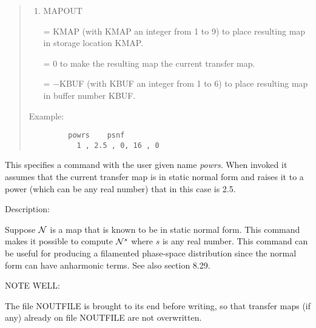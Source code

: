 \begin{quotation}
\begin{enumerate}
      \item  MAPOUT

             = KMAP (with KMAP an integer from 1 to 9) to place resulting
               map in \hspace*{1em}storage location KMAP.

             = 0 to make the resulting map the current transfer map.

             = $-$KBUF (with KBUF an integer from 1 to 6) to place resulting
               map in \hspace*{1em}buffer number KBUF.
\end{enumerate}

\vspace{5mm}
\noindent     Example:
\begin{verbatim}
         powrs    psnf
           1 , 2.5 , 0, 16 , 0
\end{verbatim}
\end{quotation}
This specifies a command with the user given name {\em powrs}.  When invoked it assumes that the current transfer map is in static normal form and raises it to a power (which can be any real number) that in this case is 2.5.

\vspace{5mm}
     Description:
\vspace{2mm}

Suppose ${\cal N}$ is a map that is known to be in static normal form.  This command makes it possible to compute ${\cal N}^s$ where $s$ is any real number.  This command can be useful for producing a filamented phase-space distribution since the normal form can have anharmonic terms.  See also section 8.29.

\vspace{5mm}
NOTE WELL:
\vspace{2mm}

     The file NOUTFILE is brought to its end before writing, so that
transfer maps (if any) already on file NOUTFILE are not overwritten.

\newpage
